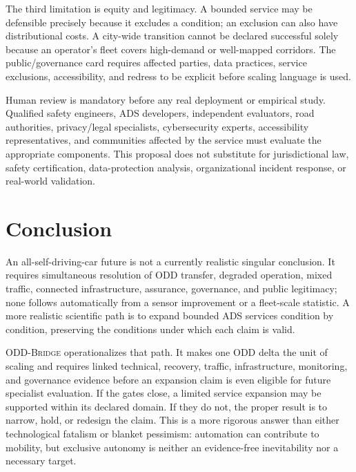 \documentclass[conference]{../../../../Conference-LaTeX-template_10-17-19/IEEEtran}
\newcommand{\oddbridge}{\textsc{ODD-Bridge}}
\begin{document}
The third limitation is equity and legitimacy. A bounded service may be defensible precisely because it excludes a condition; an exclusion can also have distributional costs. A city-wide transition cannot be declared successful solely because an operator's fleet covers high-demand or well-mapped corridors. The public/governance card requires affected parties, data practices, service exclusions, accessibility, and redress to be explicit before scaling language is used.

Human review is mandatory before any real deployment or empirical study. Qualified safety engineers, ADS developers, independent evaluators, road authorities, privacy/legal specialists, cybersecurity experts, accessibility representatives, and communities affected by the service must evaluate the appropriate components. This proposal does not substitute for jurisdictional law, safety certification, data-protection analysis, organizational incident response, or real-world validation.

\section{Conclusion}
An all-self-driving-car future is not a currently realistic singular conclusion. It requires simultaneous resolution of ODD transfer, degraded operation, mixed traffic, connected infrastructure, assurance, governance, and public legitimacy; none follows automatically from a sensor improvement or a fleet-scale statistic. A more realistic scientific path is to expand bounded ADS services condition by condition, preserving the conditions under which each claim is valid.

\oddbridge{} operationalizes that path. It makes one ODD delta the unit of scaling and requires linked technical, recovery, traffic, infrastructure, monitoring, and governance evidence before an expansion claim is even eligible for future specialist evaluation. If the gates close, a limited service expansion may be supported within its declared domain. If they do not, the proper result is to narrow, hold, or redesign the claim. This is a more rigorous answer than either technological fatalism or blanket pessimism: automation can contribute to mobility, but exclusive autonomy is neither an evidence-free inevitability nor a necessary target.
\end{document}
